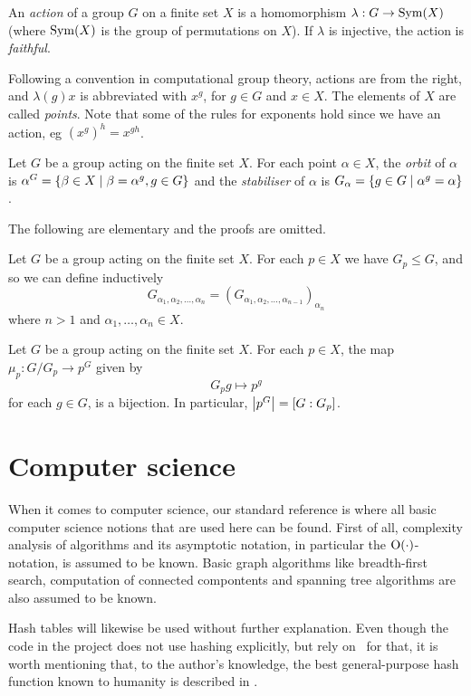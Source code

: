 \begin{deff}
An \emph{action} of a group $G$ on a finite set $X$ is a homomorphism
$\lambda : G \to \operatorname{Sym}( X )$ (where $\operatorname{Sym}( X )$ is the group of
permutations on $X$). If $\lambda$ is injective, the action is
\emph{faithful}. 
\end{deff}
\begin{remark}
Following a convention in computational group theory, actions are from the right, and $\lambda(g)x$ is abbreviated with $x^g$, for $g \in G$ and $x \in X$. The elements of $X$ are called \emph{points}. Note that some of the rules for exponents hold since we have an action, eg $(x^g)^h = x^{gh}$.
\end{remark}

\begin{deff}
Let $G$ be a group acting on the finite set $X$. For each point
$\alpha \in X$, the \emph{orbit} of $\alpha$ is $\alpha^G = \left\lbrace \beta
\in X \mid \beta = \alpha^g, g \in G \right\rbrace$ and the \emph{stabiliser} of
$\alpha$ is $G_{\alpha} = \left\lbrace g \in G \mid \alpha^g = \alpha \right\rbrace$.
\end{deff}

The following are elementary and the proofs are omitted.
\begin{pr}
Let $G$ be a group acting on the finite set $X$. For each $p \in X$ we have $G_p \leq G$, and so we can define inductively 
\begin{equation}
G_{\alpha_1, \alpha_2, \dotsc, \alpha_n} = (G_{\alpha_1, \alpha_2, \dotsc, \alpha_{n - 1}})_{\alpha_n}
\end{equation}
where $n > 1$ and $\alpha_1, \dotsc, \alpha_n \in X$.
\end{pr}

\begin{pr} \label{thm_orbit_stab}
Let $G$ be a group acting on the finite set $X$. For each $p \in X$, the map $\mu_p : G / G_p \to p^G$ given by
\begin{equation}
G_p g \mapsto p^g
\end{equation}
for each $g \in G$, is a bijection. In particular, $\left\lvert p^G \right\rvert = [G : G_p]$.
\end{pr}

\section{Computer science}
When it comes to computer science, our standard reference is
\cite{clr90} where all basic computer science notions that are used here can be
found. First of all, complexity analysis of algorithms and its
asymptotic notation, in particular the $\operatorname{O} ( \cdot )$-notation, is assumed to be
known. Basic graph algorithms like breadth-first search, computation
of connected compontents and spanning tree algorithms are also assumed to be known.

Hash tables will likewise be used without further explanation. Even
though the code in the project does not use hashing explicitly, but
rely on \GAP~for that, it is worth mentioning that, to the author's
knowledge, the best general-purpose hash function known to humanity is
described in \cite{jenkins97}.

